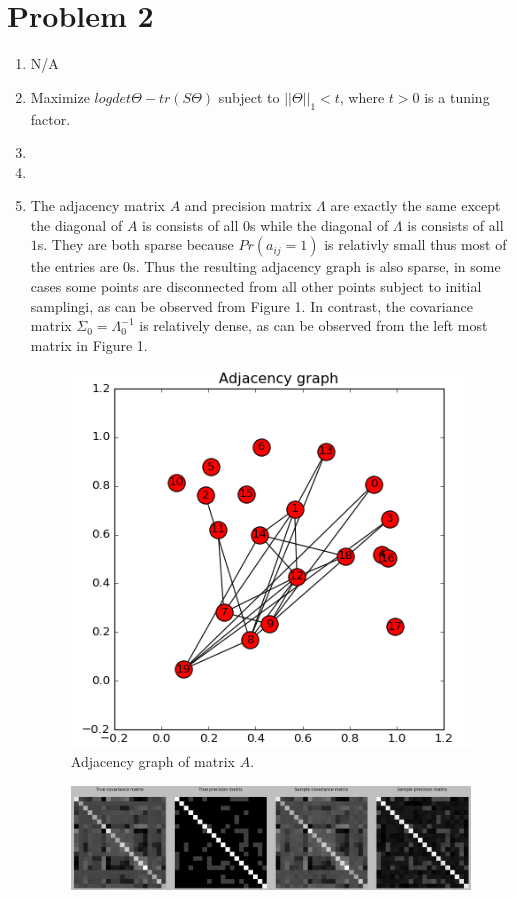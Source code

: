\documentclass{article}
\begin{document}
\section{Problem 2}
\begin{enumerate}
\item
    N/A
\item
    Maximize $log det\Theta - tr(S\Theta)$ subject to $||\Theta||_1 < t$, where $t > 0$ is a tuning factor.
\item
\item
\item
    The adjacency matrix $A$ and precision matrix $\Lambda$ are exactly the same except the diagonal of $A$ is consists of all $0$s while the diagonal of $\Lambda$ is consists of all $1$s. They are both sparse because $Pr(a_{ij} = 1)$ is relativly small thus most of the entries are $0$s. Thus the resulting adjacency graph is also sparse, in some cases some points are disconnected from all other points subject to initial samplingi, as can be observed from Figure 1. In contrast, the covariance matrix $\Sigma_0 = \Lambda_0^{-1}$ is relatively dense, as can be observed from the left most matrix in Figure 1.
    \begin{figure}[h]
        \includegraphics[width=.6\linewidth]{adj.png}
        \caption{Adjacency graph of matrix $A$.}
    \end{figure}
    \begin{figure}[h]
        \includegraphics[width=1.15\linewidth]{true.png}

\end{figure}
\end{enumerate}
\end{document}
